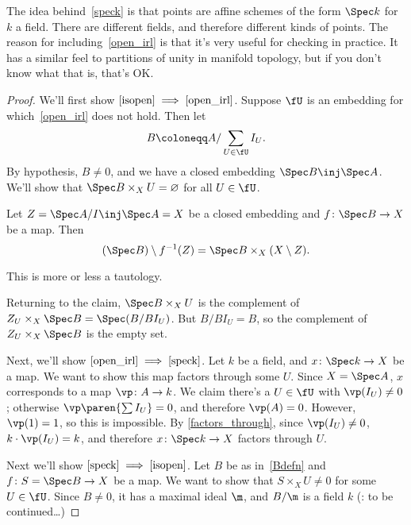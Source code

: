 The idea behind~\eqref{speck} is that points are affine schemes of the form $\Spec k$ for $k$ a field. There are
different fields, and therefore different kinds of points. The reason for including~\eqref{open_irl} is that it's
very useful for checking in practice. It has a similar feel to partitions of unity in manifold topology, but if you
don't know what that is, that's OK.
\begin{proof}
We'll first show $\eqref{isopen} \implies \eqref{open_irl}$. Suppose $\fU$ is an embedding for
which~\eqref{open_irl} does not hold. Then let
\begin{equation}
\label{Bdefn}
	B\coloneqq A/\sum_{U\in\fU} I_U.
\end{equation}
By hypothesis, $B\ne 0$, and we have a closed embedding $\Spec B\inj\Spec A$. We'll show that $\Spec B\times_X U =
\varnothing$ for all $U\in\fU$.
\begin{lem}
Let $Z = \Spec A/I\inj\Spec A = X$ be a closed embedding and $f\colon\Spec B\to X$ be a map. Then
\[(\Spec B)\setminus f^{-1}(Z) = \Spec B\times_X (X\setminus Z).\]
\end{lem}
This is more or less a tautology.

Returning to the claim, $\Spec B\times_X U$ is the complement of $Z_U\times_X\Spec B = \Spec(B/BI_U)$. But $B/BI_U
= B$, so the complement of $Z_U\times_X\Spec B$ is the empty set.

Next, we'll show $\eqref{open_irl} \implies \eqref{speck}$. Let $k$ be a field, and $x\colon\Spec k\to X$ be a map.
We want to show this map factors through some $U$. Since $X = \Spec A$, $x$ corresponds to a map $\vp\colon A\to
k$. We claim there's a $U\in\fU$ with $\vp(I_U)\ne 0$; otherwise $\vp\paren{\sum I_U} = 0$, and therefore $\vp(A) =
0$. However, $\vp(1) = 1$, so this is impossible. By \cref{factors_through}, since $\vp(I_U)\ne 0$, $k\cdot
\vp(I_U) = k$, and therefore $x\colon\Spec k\to X$ factors through $U$.

Next we'll show $\eqref{speck} \implies \eqref{isopen}$. Let $B$ be as in~\eqref{Bdefn} and $f\colon S =
\Spec B\to X$ be a map. We want to show that $S\times_X U\ne 0$ for some $U\in\fU$. Since $B\ne 0$, it has a
maximal ideal $\m$, and $B/\m$ is a field $k$ (\TODO: to be continued\dots)

\end{proof}
